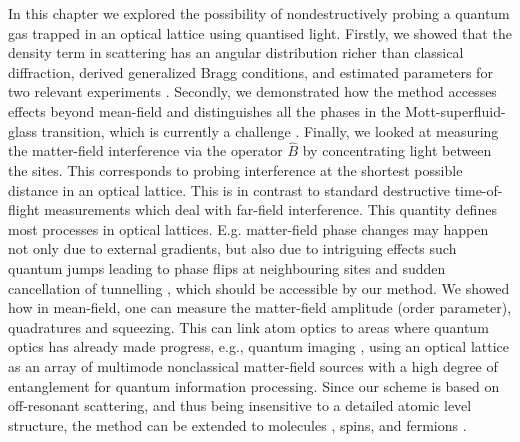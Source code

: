In this chapter we explored the possibility of nondestructively
probing a quantum gas trapped in an optical lattice using quantised
light. Firstly, we showed that the density term in scattering has an
angular distribution richer than classical diffraction, derived
generalized Bragg conditions, and estimated parameters for two
relevant experiments \cite{weitenberg2011, miyake2011}. Secondly, we
demonstrated how the method accesses effects beyond mean-field and
distinguishes all the phases in the Mott-superfluid-glass transition,
which is currently a challenge \cite{derrico2014}. Finally, we looked
at measuring the matter-field interference via the operator $\hat{B}$
by concentrating light between the sites. This corresponds to probing
interference at the shortest possible distance in an optical
lattice. This is in contrast to standard destructive time-of-flight
measurements which deal with far-field interference. This quantity
defines most processes in optical lattices. E.g. matter-field phase
changes may happen not only due to external gradients, but also due to
intriguing effects such quantum jumps leading to phase flips at
neighbouring sites and sudden cancellation of tunnelling
\cite{vukics2007}, which should be accessible by our method. We showed
how in mean-field, one can measure the matter-field amplitude (order
parameter), quadratures and squeezing. This can link atom optics to
areas where quantum optics has already made progress, e.g., quantum
imaging \cite{golubev2010, kolobov1999}, using an optical lattice as
an array of multimode nonclassical matter-field sources with a high
degree of entanglement for quantum information processing. Since our
scheme is based on off-resonant scattering, and thus being insensitive
to a detailed atomic level structure, the method can be extended to
molecules \cite{LP2013}, spins, and fermions \cite{ruostekoski2009}.

